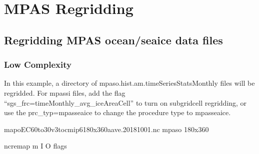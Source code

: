 \documentclass[letterpaper,10pt,english]{sphinxmanual}
\begin{document}
\chapter{MPAS Regridding}
\label{\detokenize{mpas_regrid:mpas-regridding}}\label{\detokenize{mpas_regrid:id1}}\label{\detokenize{mpas_regrid::doc}}

\section{Regridding MPAS ocean/sea\sphinxhyphen{}ice data files}
\label{\detokenize{mpas_regrid:regridding-mpas-ocean-sea-ice-data-files}}

\subsection{Low Complexity}
\label{\detokenize{mpas_regrid:low-complexity}}
In this example, a directory of mpaso.hist.am.timeSeriesStatsMonthly files will be regridded.
For mpassi files, add the flag “\textendash{}sgs\_frc=timeMonthly\_avg\_iceAreaCell” to turn on sub\sphinxhyphen{}grid\sphinxhyphen{}cell regridding,
or use the \textendash{}prc\_typ=mpasseaice to change the procedure type to mpas\sphinxhyphen{}sea\sphinxhyphen{}ice.

\begin{sphinxVerbatim}[commandchars=\\\{\}]
map\PYGZus{}oEC60to30v3\PYGZus{}to\PYGZus{}cmip6\PYGZus{}180x360\PYGZus{}aave.20181001.nc   
mpaso                                             
180x360                                          
                                

ncremap \PYGZhy{}m  \PYGZhy{}I  \PYGZhy{}O  flags
\end{sphinxVerbatim}
\end{document}
